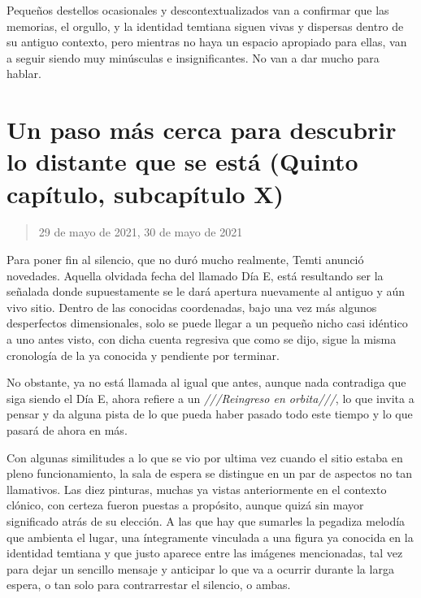 \documentclass[
  spanish,
]{book}
\begin{document}
Pequeños destellos ocasionales y descontextualizados van a confirmar que las memorias, el orgullo, y la identidad temtiana siguen vivas y dispersas dentro de su antiguo contexto, pero mientras no haya un espacio apropiado para ellas, van a seguir siendo muy minúsculas e insignificantes. No van a dar mucho para hablar.

\hypertarget{un-paso-muxe1s-cerca-para-descubrir-lo-distante-que-se-estuxe1-quinto-capuxedtulo-subcapuxedtulo-x}{%
\section{Un paso más cerca para descubrir lo distante que se está (Quinto capítulo, subcapítulo X)}\label{un-paso-muxe1s-cerca-para-descubrir-lo-distante-que-se-estuxe1-quinto-capuxedtulo-subcapuxedtulo-x}}

\begin{quote}
29 de mayo de 2021, 30 de mayo de 2021
\end{quote}

Para poner fin al silencio, que no duró mucho realmente, Temti anunció novedades. Aquella olvidada fecha del llamado Día E, está resultando ser la señalada donde supuestamente se le dará apertura nuevamente al antiguo y aún vivo sitio. Dentro de las conocidas coordenadas, bajo una vez más algunos desperfectos dimensionales, solo se puede llegar a un pequeño nicho casi idéntico a uno antes visto, con dicha cuenta regresiva que como se dijo, sigue la misma cronología de la ya conocida y pendiente por terminar.

No obstante, ya no está llamada al igual que antes, aunque nada contradiga que siga siendo el Día E, ahora refiere a un \emph{///Reingreso en orbita///}, lo que invita a pensar y da alguna pista de lo que pueda haber pasado todo este tiempo y lo que pasará de ahora en más.

Con algunas similitudes a lo que se vio por ultima vez cuando el sitio estaba en pleno funcionamiento, la sala de espera se distingue en un par de aspectos no tan llamativos. Las diez pinturas, muchas ya vistas anteriormente en el contexto clónico, con certeza fueron puestas a propósito, aunque quizá sin mayor significado atrás de su elección. A las que hay que sumarles la pegadiza melodía que ambienta el lugar, una íntegramente vinculada a una figura ya conocida en la identidad temtiana y que justo aparece entre las imágenes mencionadas, tal vez para dejar un sencillo mensaje y anticipar lo que va a ocurrir durante la larga espera, o tan solo para contrarrestar el silencio, o ambas.
\end{document}
